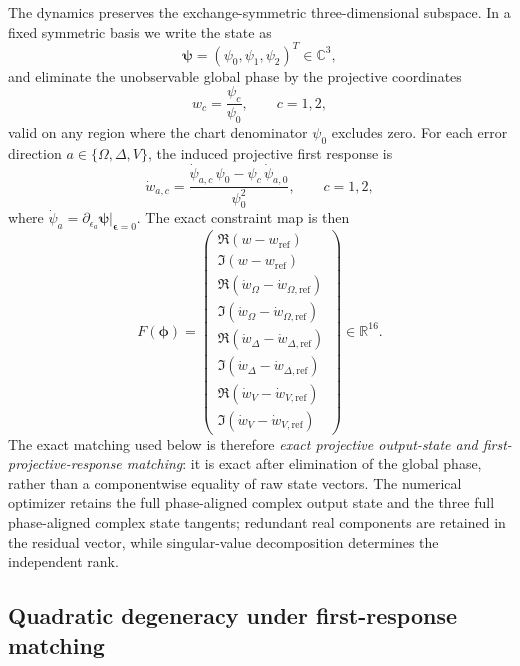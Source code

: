 \documentclass[11pt]{article}
\newcommand{\R}{\mathbb{R}}
\newcommand{\C}{\mathbb{C}}
\begin{document}
The dynamics preserves the exchange-symmetric three-dimensional subspace. In a fixed symmetric basis we write the state as
\[
\boldsymbol{\psi}=(\psi_0,\psi_1,\psi_2)^{T}\in\C^3,
\]
and eliminate the unobservable global phase by the projective coordinates
\begin{equation}
w_c=\frac{\psi_c}{\psi_0},
\qquad
c=1,2,
\label{eq:projcoords}
\end{equation}
valid on any region where the chart denominator $\psi_0$ excludes zero. For each error direction $a\in\{\Omega,\Delta,V\}$, the induced projective first response is
\begin{equation}
\dot w_{a,c}
=
\frac{\dot\psi_{a,c}\,\psi_0-\psi_c\,\dot\psi_{a,0}}{\psi_0^{2}},
\qquad
c=1,2,
\label{eq:projresp}
\end{equation}
where $\dot\psi_{a}=\partial_{\epsilon_a}\boldsymbol{\psi}\bigr|_{\boldsymbol{\epsilon}=0}$. The exact constraint map is then
\begin{equation}
F(\boldsymbol{\phi})
=
\begin{pmatrix}
\Re(w-w_{\mathrm{ref}})\\
\Im(w-w_{\mathrm{ref}})\\
\Re(\dot w_{\Omega}-\dot w_{\Omega,\mathrm{ref}})\\
\Im(\dot w_{\Omega}-\dot w_{\Omega,\mathrm{ref}})\\
\Re(\dot w_{\Delta}-\dot w_{\Delta,\mathrm{ref}})\\
\Im(\dot w_{\Delta}-\dot w_{\Delta,\mathrm{ref}})\\
\Re(\dot w_{V}-\dot w_{V,\mathrm{ref}})\\
\Im(\dot w_{V}-\dot w_{V,\mathrm{ref}})
\end{pmatrix}
\in\R^{16}.
\label{eq:constraintmap}
\end{equation}
The exact matching used below is therefore \emph{exact projective output-state and first-projective-response matching}: it is exact after elimination of the global phase, rather than a componentwise equality of raw state vectors. The numerical optimizer retains the full phase-aligned complex output state and the three full phase-aligned complex state tangents; redundant real components are retained in the residual vector, while singular-value decomposition determines the independent rank.

\subsection{Quadratic degeneracy under first-response matching}
\end{document}
